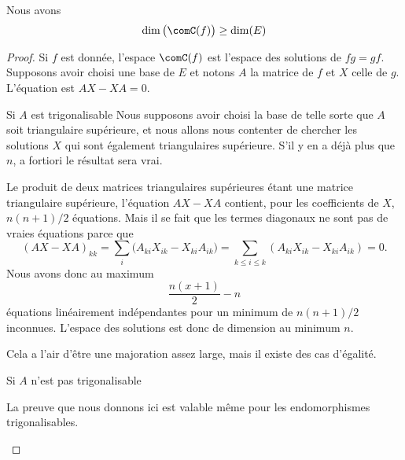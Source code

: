 \begin{lemma}       \label{LEMooDFFDooJTQkRu}
    Nous avons
    \begin{equation}
        \dim\big( \comC(f) \big)\geq \dim(E)
    \end{equation}
\end{lemma}

\begin{proof}
    Si \( f\) est donnée, l'espace \( \comC(f)\) est l'espace des solutions de \( fg=gf\). Supposons avoir choisi une base de \( E\) et notons \( A\) la matrice de \( f\) et \( X\) celle de \( g\). L'équation est \( AX-XA=0\).
    \begin{subproof}
        \item[Si \( A\) est trigonalisable]
            Nous supposons avoir choisi la base de telle sorte que \( A\) soit triangulaire supérieure, et nous allons nous contenter de chercher les solutions \( X\) qui sont également triangulaires supérieure. S'il y en a déjà plus que \( n\), a fortiori le résultat sera vrai.

            Le produit de deux matrices triangulaires supérieures étant une matrice triangulaire supérieure, l'équation \( AX-XA\) contient, pour les coefficients de \( X\), \( n(n+1)/2\) équations. Mais il se fait que les termes diagonaux ne sont pas de vraies équations parce que
            \begin{equation}
                (AX-XA)_{kk}=\sum_i\big( A_{ki}X_{ik}-X_{ki}A_{ik} \big)=\sum_{k\leq i\leq k}(A_{ki}X_{ik}-X_{ki}A_{ik})=0.
            \end{equation}
            Nous avons donc au maximum
            \begin{equation}
                \frac{ n(x+1) }{2}-n
            \end{equation}
            équations linéairement indépendantes pour un minimum de \( n(n+1)/2\) inconnues. L'espace des solutions est donc de dimension au minimum \( n\).

            Cela a l'air d'être une majoration assez large, mais il existe des cas d'égalité.

        \item[Si \( A\) n'est pas trigonalisable]

            La preuve que nous donnons ici est valable même pour les endomorphismes trigonalisables.


\end{subproof}
\end{proof}
